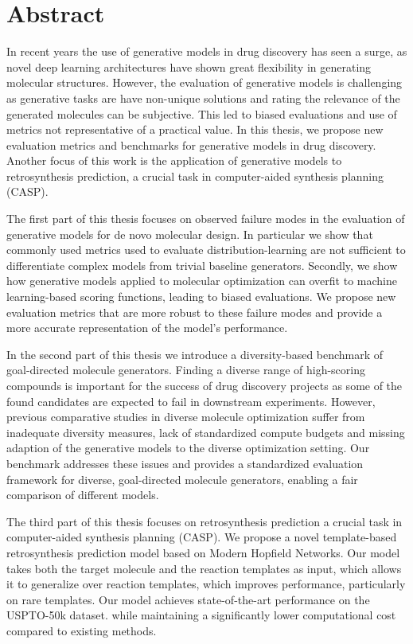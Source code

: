 
{%
\chapter*{Abstract}
In recent years the use of generative models in drug discovery has seen a surge, as novel deep
learning architectures have shown great flexibility in generating molecular structures. However, the
evaluation of generative models is challenging as generative tasks are have non-unique solutions and
rating the relevance of the generated molecules can be subjective. This led to biased evaluations
and use of metrics not representative of a practical value. In this thesis, we propose new
evaluation metrics and benchmarks for generative models in drug discovery. Another focus of this
work is the application of generative models to retrosynthesis prediction, a crucial task in
computer-aided synthesis planning (CASP). 

The first part of this thesis focuses on observed failure modes in the evaluation of generative
models for de novo molecular design. In particular we show that commonly used metrics used to
evaluate distribution-learning are not sufficient to differentiate complex models from trivial
baseline generators. Secondly, we show how generative models applied to molecular optimization can
overfit to machine learning-based scoring functions, leading to biased evaluations. We propose new
evaluation metrics that are more robust to these failure modes and provide a more accurate
representation of the model's performance. 

In the second part of this thesis we introduce a diversity-based benchmark of goal-directed molecule
generators. Finding a diverse range of high-scoring compounds is important for the success of drug
discovery projects as some of the found candidates are expected to fail in downstream experiments.
However, previous comparative studies in diverse molecule optimization suffer from inadequate
diversity measures, lack of standardized compute budgets and missing adaption of the generative models
to the diverse optimization setting. Our benchmark addresses these issues and provides a standardized
evaluation framework for diverse, goal-directed molecule generators, enabling a fair comparison of
different models.

The third part of this thesis focuses on retrosynthesis prediction a crucial task in computer-aided
synthesis planning (CASP). We propose a novel template-based retrosynthesis prediction model based
on Modern Hopfield Networks. Our model takes both the target molecule and the reaction templates 
as input, which allows it to generalize over reaction templates, which improves 
performance, particularly on rare templates. Our model achieves state-of-the-art performance on the USPTO-50k dataset.
while maintaining a significantly lower computational cost compared to existing methods. 

}
